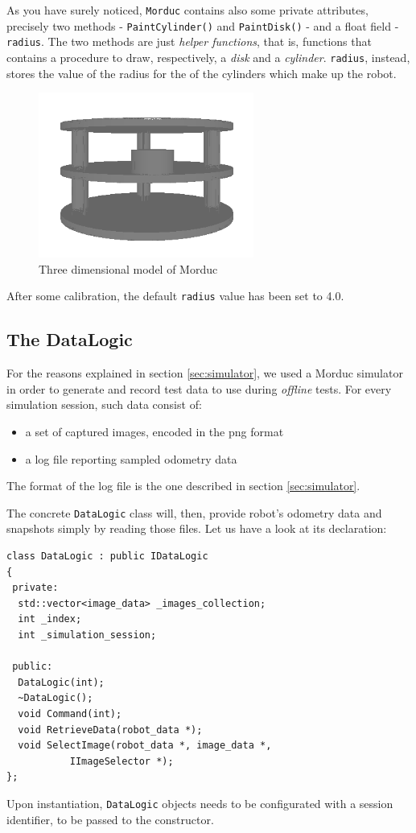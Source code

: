 %
As you have surely noticed, \texttt{Morduc} contains also 
some private attributes, precisely two methods - 
\texttt{PaintCylinder()} and \texttt{PaintDisk()} - and 
a float field - \texttt{radius}.
%
The two methods are just \textit{helper functions}, that is, 
functions that contains a procedure to draw, respectively,  
a \textit{disk} and a \textit{cylinder}.
%
\texttt{radius}, instead, stores the value of the radius 
for the of the cylinders which make up the robot.
%
\begin{figure}[!h]
  \begin{center}
    \includegraphics[width=200pt]{img/3morduc_opengl.png}
    \caption{Three dimensional model of Morduc}
    \label{fig:3morduc_opengl}
  \end{center}
\end{figure}
%
After some calibration, the default \texttt{radius} value 
has been set to 4.0.
%

%
\subsection{The DataLogic}
\label{sub:datasource}
For the reasons explained in section \ref{sec:simulator}, 
we used a Morduc simulator in order to generate and record 
test data to use during \textit{offline} tests.
%
For every simulation session, such data consist of:
%
\begin{itemize}
  \item a set of captured images, encoded in the png format
  \item a log file reporting sampled odometry data
\end{itemize}
%
The format of the log file is the one described in section 
\ref{sec:simulator}.
%

%
The concrete \texttt{DataLogic} class will, then, provide 
robot's odometry data and snapshots simply by reading 
those files.
%
Let us have a look at its declaration:
%
\begin{lstlisting}[caption={\texttt{DataLogic} declaration}, label={code:datalogic}, frame=trBL]
class DataLogic : public IDataLogic
{
 private:
  std::vector<image_data> _images_collection;
  int _index;
  int _simulation_session;
  
 public:
  DataLogic(int);
  ~DataLogic();
  void Command(int);
  void RetrieveData(robot_data *);
  void SelectImage(robot_data *, image_data *,
		   IImageSelector *);
};
\end{lstlisting}
%
Upon instantiation, \texttt{DataLogic} objects needs to be 
configurated with a session identifier, to be passed to 
the constructor. 
%

